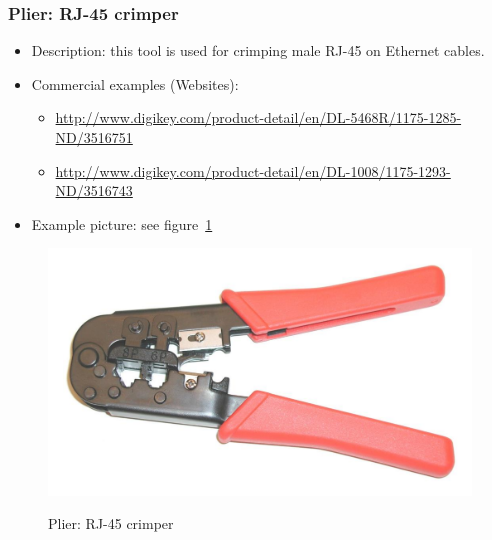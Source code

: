 \subsubsection{Plier: RJ-45 crimper} \label{DEVICE:TOOLCRIMPERRJ45}
\begin{itemize}
\item Description: this tool is used for crimping male RJ-45 on Ethernet cables.
  \item Commercial examples (Websites):
  \begin{itemize}
    \item   \href{http://www.digikey.com/product-detail/en/DL-5468R/1175-1285-ND/3516751}{http://www.digikey.com/product-detail/en/DL-5468R/1175-1285-ND/3516751}
    \item   \href{http://www.digikey.com/product-detail/en/DL-1008/1175-1293-ND/3516743}{http://www.digikey.com/product-detail/en/DL-1008/1175-1293-ND/3516743}
  \end{itemize}
  \item Example picture: see figure~\ref{FIG:DEVICECRIMPERRJ45}
\end{itemize}
\begin{figure}
  \centering
  \includegraphics[angle=90,width=1\columnwidth]{figs/body02/FIGDEVICECRIMPERRJ45.pdf}\\
  \caption[Plier: RJ-45 crimper]{Plier: RJ-45 crimper}
  \label{FIG:DEVICECRIMPERRJ45}
\end{figure}
